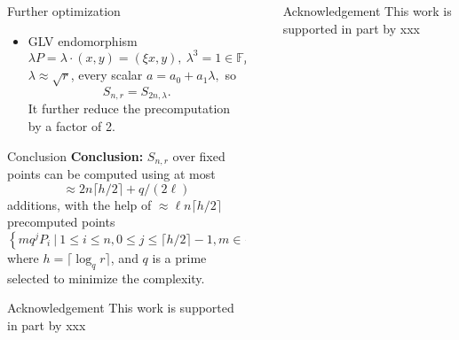 \documentclass[final]{beamer}
\newlength{\sepwid}
\newlength{\onecolwid}
\begin{document}
\begin{frame}[t]
\begin{columns}[t]
\begin{column}{\onecolwid}
\begin{block}{Further optimization}
\begin{itemize}
		\item GLV endomorphism 
		\[\lambda P = \lambda\cdot (x,y) = (\xi x, y),\  \lambda^3=1\in \mathbb{F}_r, \xi^3=1 \in \mathbb{F}_p,\]			
		$\lambda \approx \sqrt{r}$, every scalar 
		$a = a_0 + a_1\lambda,$	so			
		\[S_{n,r} = S_{2n,\lambda}.\]	
		It further reduce the precomputation by a factor of 2.
		
	\end{itemize}
\end{block}

\begin{block}{Conclusion}
\small
\textbf{Conclusion:} $S_{n,r}$ over fixed points can be computed using at most $$\approx 2n\lceil h/2\rceil + q/(2\ell)$$
								additions, with the help of $\approx \ell n\lceil h/2 \rceil$ precomputed points
								\begin{equation*}
								\left\{mq^jP_i\ |\ 1\le i\le n,0\le j\le \lceil h/2\rceil-1,m\in \{1,2,...,2^{\ell-1}\}\right\},
								\end{equation*}	
			where $h = \lceil \log_q r\rceil$, and $q$ is a prime selected to minimize the complexity.
\end{block}

\begin{block}{Acknowledgement}
This work is supported in part by xxx
\end{block}

\end{column} %


\begin{column}{\sepwid}\end{column} %

\begin{column}{\onecolwid} 

\begin{block}{Acknowledgement}
This work is supported in part by xxx
\end{block}

\end{column} 
\end{columns} %

\end{frame} %
\end{document}
